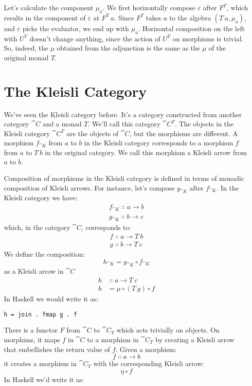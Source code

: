 Let's calculate the component $\mu_a$. We first horizontally compose
$\varepsilon$ after $F^T$, which results in the component of
$\varepsilon$ at $F^T\ a$. Since $F^T$ takes $a$ to the
algebra $(T\ a, \mu_a)$, and $\varepsilon$ picks the evaluator, we end
up with $\mu_a$. Horizontal composition on the left with $U^T$
doesn't change anything, since the action of $U^T$ on morphisms is
trivial. So, indeed, the $\mu$ obtained from the adjunction is the
same as the $\mu$ of the original monad $T$.

\section{The Kleisli Category}

We've seen the Kleisli category before. It's a category constructed from
another category $\cat{C}$ and a monad $T$. We'll call this
category $\cat{C}^T$. The objects in the Kleisli category
$\cat{C}^T$ are the objects of $\cat{C}$, but the morphisms
are different. A morphism $f_{\cat{K}}$ from $a$ to $b$ in
the Kleisli category corresponds to a morphism $f$ from
$a$ to $T\ b$ in the original category. We call this
morphism a Kleisli arrow from $a$ to $b$.

Composition of morphisms in the Kleisli category is defined in terms of
monadic composition of Kleisli arrows. For instance, let's compose
$g_{\cat{K}}$ after $f_{\cat{K}}$. In the Kleisli category we have:
\begin{gather*}
f_{\cat{K}} \Colon a \to b \\
g_{\cat{K}} \Colon b \to c
\end{gather*}
which, in the category $\cat{C}$, corresponds to:
\begin{gather*}
f \Colon a \to T\ b \\
g \Colon b \to T\ c
\end{gather*}
We define the composition:
\[h_{\cat{K}} = g_{\cat{K}} \circ f_{\cat{K}}\]
as a Kleisli arrow in $\cat{C}$
\begin{align*}
h &\Colon a \to T\ c \\
h &= \mu \circ (T\ g) \circ f
\end{align*}
In Haskell we would write it as:

\begin{Verbatim}
h = join . fmap g . f
\end{Verbatim}
There is a functor $F$ from $\cat{C}$ to $\cat{C}_T$
which acts trivially on objects. On morphims, it maps $f$ in
$\cat{C}$ to a morphism in $\cat{C}_T$ by creating a
Kleisli arrow that embellishes the return value of $f$. Given a
morphism:
\[f \Colon a \to b\]
it creates a morphism in $\cat{C}_T$ with the
corresponding Kleisli arrow:
\[\eta \circ f\]
In Haskell we'd write it as:

